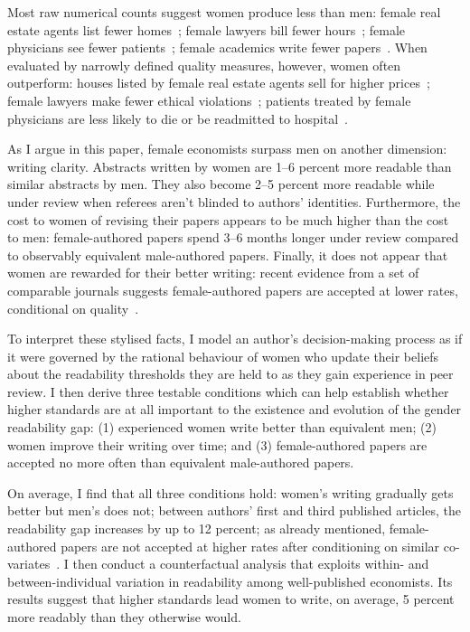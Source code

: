 Most raw numerical counts suggest women produce less than men: female real estate agents list fewer homes~\citep{Seagraves2013}; female lawyers bill fewer hours~\citep{Azmat2017}; female physicians see fewer patients~\citep{Bloor2008}; female academics write fewer papers~\citep{Ceci2014}. When evaluated by narrowly defined quality measures, however, women often outperform: houses listed by female real estate agents sell for higher prices~\citep{Salter2012,Seagraves2013}; female lawyers make fewer ethical violations~\citep{Hatamyar2004}; patients treated by female physicians are less likely to die or be readmitted to hospital~\citep{Tsugawa2016}.

As I argue in this paper, female economists surpass men on another dimension: writing clarity. Abstracts written by women are 1--6 percent more readable than similar abstracts by men. They also become 2--5 percent more readable while under review when referees aren't blinded to authors' identities. Furthermore, the cost to women of revising their papers appears to be much higher than the cost to men: female-authored papers spend 3--6 months longer under review compared to observably equivalent male-authored papers. Finally, it does not appear that women are rewarded for their better writing: recent evidence from a set of comparable journals suggests female-authored papers are accepted at lower rates, conditional on quality~\citep{Card2020}.

To interpret these stylised facts, I model an author's decision-making process as if it were governed by the rational behaviour of women who update their beliefs about the readability thresholds they are held to as they gain experience in peer review. I then derive three testable conditions which can help establish whether higher standards are at all important to the existence and evolution of the gender readability gap: (1) experienced women write better than equivalent men; (2) women improve their writing over time; and (3) female-authored papers are accepted no more often than equivalent male-authored papers.

On average, I find that all three conditions hold: women's writing gradually gets better but men's does not; between authors' first and third published articles, the readability gap increases by up to 12 percent; as already mentioned, female-authored papers are not accepted at higher rates after conditioning on similar co-variates~\citep{Card2020}. I then conduct a counterfactual analysis that exploits within- and between-individual variation in readability among well-published economists. Its results suggest that higher standards lead women to write, on average, 5 percent more readably than they otherwise would.

